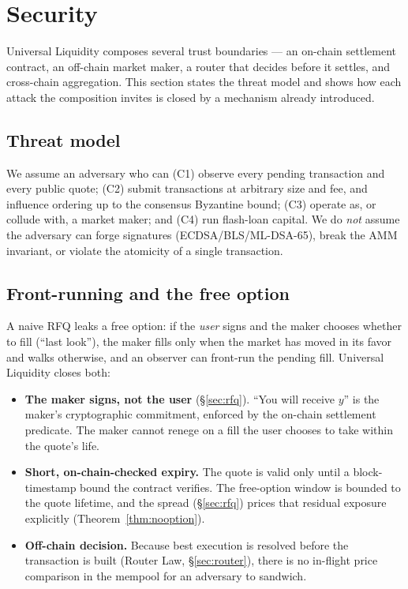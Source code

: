 \section{Security}
\label{sec:security}

Universal Liquidity composes several trust boundaries --- an on-chain
settlement contract, an off-chain market maker, a router that decides
before it settles, and cross-chain aggregation. This section states the
threat model and shows how each attack the composition invites is closed by
a mechanism already introduced.

\subsection{Threat model}

We assume an adversary who can (C1) observe every pending transaction and
every public quote; (C2) submit transactions at arbitrary size and fee, and
influence ordering up to the consensus Byzantine bound; (C3) operate as, or
collude with, a market maker; and (C4) run flash-loan capital. We do
\emph{not} assume the adversary can forge signatures (ECDSA/BLS/ML-DSA-65),
break the AMM invariant, or violate the atomicity of a single transaction.

\subsection{Front-running and the free option}

A naive RFQ leaks a free option: if the \emph{user} signs and the maker
chooses whether to fill (``last look''), the maker fills only when the
market has moved in its favor and walks otherwise, and an observer can
front-run the pending fill. Universal Liquidity closes both:

\begin{itemize}[leftmargin=1.4em]
  \item \textbf{The maker signs, not the user} (\S\ref{sec:rfq}). ``You
  will receive $y$'' is the maker's cryptographic commitment, enforced by
  the on-chain settlement predicate. The maker cannot renege on a fill the
  user chooses to take within the quote's life.
  \item \textbf{Short, on-chain-checked expiry.} The quote is valid only
  until a block-timestamp bound the contract verifies. The free-option
  window is bounded to the quote lifetime, and the spread (\S\ref{sec:rfq})
  prices that residual exposure explicitly (Theorem~\ref{thm:nooption}).
  \item \textbf{Off-chain decision.} Because best execution is resolved
  before the transaction is built (Router Law, \S\ref{sec:router}), there
  is no in-flight price comparison in the mempool for an adversary to
  sandwich.
\end{itemize}

